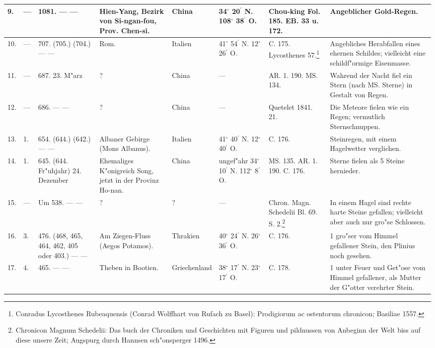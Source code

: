 \documentclass[a4paper, 8pt, oneside, polutonikogreek, german]{article}
\begin{document}
\begin{center}
\begin{longtable}{| p{4mm} | p{2mm} | p{15mm} | p{25mm} | p{16mm} | p{12mm} | p{13mm} | p{20mm} |}
        9. & --- & 1081. --- --- & Hien-Yang, Bezirk von Si-ngan-fou, Prov. Chen-si. & China & 34$^\circ$ 20$^\prime$ N. 108$^\circ$ 38$^\prime$ O. & Chou-king Fol. 185. EB. 33 u. 172. & Angeblicher Gold-Regen. \\ \hline
        10. & --- & 707. (705.) (704.) --- --- & Rom. & Italien & 41$^\circ$ 54$^\prime$ N. 12$^\circ$ 26$^\prime$ O. & C. 175. Lycosthenes 57.\footnote{Conradus Lycosthenes Rubeaquensis (Conrad Wolffhart von Rufach zu Basel): Prodigiorum ac ostentorum chronicon; Basiliae 1557.} & Angebliches Herabfallen eines ehernen Schildes; vielleicht eine schildf"ormige Eisenmasse. \\ \hline
        11. & --- & 687. 23. M"arz & ? & China & --- & AR. 1. 190. MS. 134. & Wahrend der Nacht fiel ein Stern (nach MS. Sterne) in Gestalt von Regen. \\ \hline
        12. & --- & 686. --- --- & ? & China & --- & Quetelet 1841. 21. & Die Meteore fielen wie ein Regen; vermutlich Sternschnuppen. \\ \hline
        13. & 1. & 654. (644.) (642.) --- --- & Albaner Gebirge (Mons Albanus). & Italien & 41$^\circ$ 40$^\prime$ N. 12$^\circ$ 40$^\prime$ O. & C. 176. & Steinregen, mit einem Hagelwetter verglichen. \\ \hline
        14. & 1. & 645. (644. Fr"uhjahr) 24. Dezember & Ehemaliges K"onigreich Song, jetzt in der Provinz Ho-nan. & China & ungef"ahr 34$^\circ$ 10$^\prime$ N. 112$^\circ$ 8$^\prime$ O. & MS. 135. AR. 1. 190. C. 176. & Sterne fielen als 5 Steine hernieder. \\ \hline
        15. & --- & Um 538. --- --- & ? & ? & --- & Chron. Magn. Schedelii Bl. 69. S. 2.\footnote{Chronicon Magnum Schedelii: Das buch der Chroniken und Geschichten mit Figuren und pildnussen von Anbeginn der Welt biss auf diese unsere Zeit; Augspurg durch Hannsen sch"onsperger 1496.} & In einem Hagel sind rechte harte Steine gefallen; vielleicht aber auch nur gro"se Schlossen. \\ \hline
        16. & 3. & 476. (468, 465, 464, 462, 405 oder 403.) --- --- & Am Ziegen-Fluss (Aegos Potamos). & Thrakien & 40$^\circ$ 24$^\prime$ N. 26$^\circ$ 36$^\prime$ O. & C. 176. & 1 gro"ser vom Himmel gefallener Stein, den Plinius noch gesehen. \\ \hline
        17. & 4. & 465. --- --- & Theben in Bootien. & Griechenland & 38$^\circ$ 17$^\prime$ N. 23$^\circ$ 17$^\prime$ O. & C. 178. & 1 unter Feuer und Get"ose vom Himmel gefallener, als Mutter der G"otter verehrter Stein. \\ \hline

\end{longtable}
\end{center}
\end{document}
